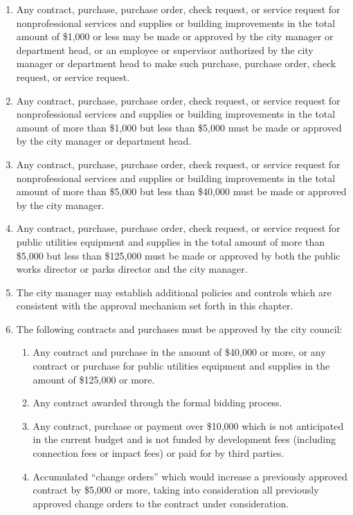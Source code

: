 \begin{enumerate}
	\item Any contract, purchase, purchase order, check request, or service request for nonprofessional services and supplies or building improvements in the total amount of \$1,000 or less may be made or approved by the city manager or department head, or an employee or supervisor authorized by the city manager or department head to make such purchase, purchase order, check request, or service request. 
	\item Any contract, purchase, purchase order, check request, or service request for nonprofessional services and supplies or building improvements in the total amount of more than \$1,000 but less than \$5,000 must be made or approved by the city manager or department head. 
	\item Any contract, purchase, purchase order, check request, or service request for nonprofessional services and supplies or building improvements in the total amount of more than \$5,000 but less than \$40,000 must be made or approved by the city manager. 
	\item Any contract, purchase, purchase order, check request, or service request for public utilities equipment and supplies in the total amount of more than \$5,000 but less than \$125,000 must be made or approved by both the public works director or parks director and the city manager. 
	\item The city manager may establish additional policies and controls which are consistent with the approval mechanism set forth in this chapter. 
	\item The following contracts and purchases must be approved by the city council: 
		\begin{enumerate}
			\item Any contract and purchase in the amount of \$40,000 or more, or any contract or purchase for public utilities equipment and supplies in the amount of \$125,000 or more. 
			\item Any contract awarded through the formal bidding process. 
			\item Any contract, purchase or payment over \$10,000 which is not anticipated in the current budget and is not funded by development fees (including connection fees or impact fees) or paid for by third parties. 
			\item Accumulated “change orders” which would increase a previously approved contract by \$5,000 or more, taking into consideration all previously approved change orders to the contract under consideration. 

\end{enumerate}
\end{enumerate}
